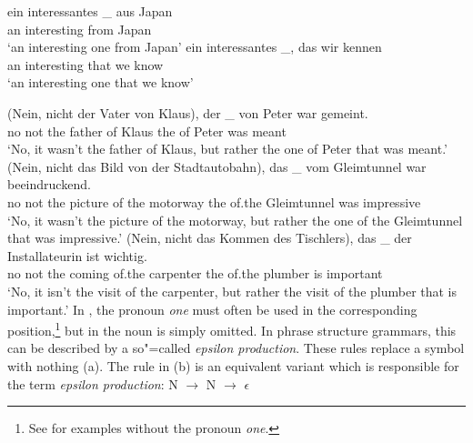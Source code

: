 \ex 
\gll ein interessantes \_ aus  Japan\\
     an  interesting   {} from Japan\\
\glt `an interesting one from Japan'
\ex 
\gll ein interessantes \_, das  wir kennen\\
     an  interesting   {}  that we  know\\
\glt `an interesting one that we know'
\zl

\eal
\label{ex-nounless-np-relational-noun}
\ex 
\gll (Nein, nicht der Vater von Klaus), der \_ von Peter war gemeint.\\
	\spacebr{}no not the father of Klaus the {} of Peter was meant\\
\glt `No, it wasn't the father of Klaus, but rather the one of Peter that was meant.'
\ex 
\gll (Nein, nicht das Bild von der Stadtautobahn), das \_ vom Gleimtunnel war beeindruckend.\\
	 \spacebr{}no not the picture of the motorway the {} of.the Gleimtunnel was impressive\\
\glt `No, it wasn't the picture of the motorway, but rather the one of the Gleimtunnel that was impressive.'
\ex 
\gll (Nein, nicht das Kommen des Tischlers), das \_ der Installateurin ist wichtig.\\
	 \spacebr{}no not the coming of.the carpenter the {} of.the plumber is important\\
\glt `No, it isn't the visit of the carpenter, but rather the visit of the plumber that is important.'
\zl
In , the pronoun
\emph{one} must often be used in the corresponding position,\footnote{%
  See \citet[Section~4.12]{FLGR2012a} for  examples without the
  pronoun \emph{one}.
} but in  the noun is
simply omitted.
In phrase structure grammars, this can be described by a so"=called \emph{epsilon production}.
These rules replace a symbol with nothing (a). The rule in (b) is an equivalent variant which is responsible for the term \emph{epsilon production}:
\eal
\label{np-epsilon}
\ex N $\to$
\ex N $\to$ $\epsilon$
\zl 

